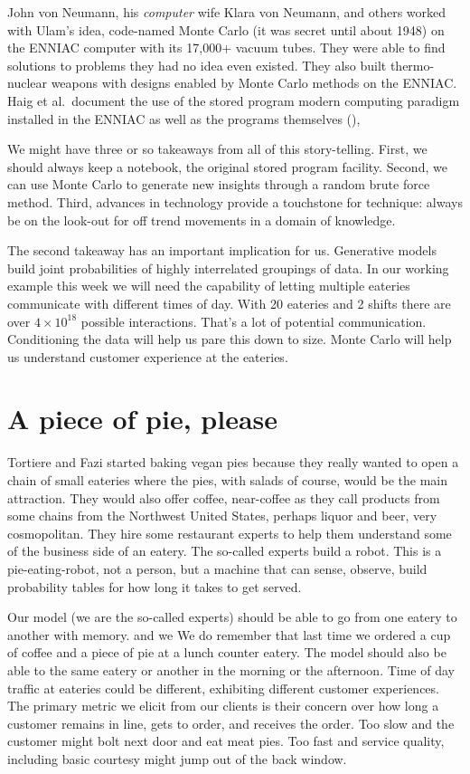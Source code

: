 \documentclass[
]{book}
\begin{document}
John von Neumann, his \emph{computer} wife Klara von Neumann, and others worked with Ulam's idea, code-named Monte Carlo (it was secret until about 1948) on the ENNIAC computer with its 17,000+ vacuum tubes. They were able to find solutions to problems they had no idea even existed. They also built thermo-nuclear weapons with designs enabled by Monte Carlo methods on the ENNIAC. Haig et al.~document the use of the stored program modern computing paradigm installed in the ENNIAC as well as the programs themselves (\citet{Haigh2014}),

We might have three or so takeaways from all of this story-telling. First, we should always keep a notebook, the original stored program facility. Second, we can use Monte Carlo to generate new insights through a random brute force method. Third, advances in technology provide a touchstone for technique: always be on the look-out for off trend movements in a domain of knowledge.

The second takeaway has an important implication for us. Generative models build joint probabilities of highly interrelated groupings of data. In our working example this week we will need the capability of letting multiple eateries communicate with different times of day. With 20 eateries and 2 shifts there are over \(4 \times 10^{18}\) possible interactions. That's a lot of potential communication. Conditioning the data will help us pare this down to size. Monte Carlo will help us understand customer experience at the eateries.

\hypertarget{a-piece-of-pie-please}{%
\section{A piece of pie, please}\label{a-piece-of-pie-please}}

Tortiere and Fazi started baking vegan pies because they really wanted to open a chain of small eateries where the pies, with salads of course, would be the main attraction. They would also offer coffee, near-coffee as they call products from some chains from the Northwest United States, perhaps liquor and beer, very cosmopolitan. They hire some restaurant experts to help them understand some of the business side of an eatery. The so-called experts build a robot. This is a pie-eating-robot, not a person, but a machine that can sense, observe, build probability tables for how long it takes to get served.

Our model (we are the so-called experts) should be able to go from one eatery to another with memory. and we We do remember that last time we ordered a cup of coffee and a piece of pie at a lunch counter eatery. The model should also be able to the same eatery or another in the morning or the afternoon. Time of day traffic at eateries could be different, exhibiting different customer experiences. The primary metric we elicit from our clients is their concern over how long a customer remains in line, gets to order, and receives the order. Too slow and the customer might bolt next door and eat meat pies. Too fast and service quality, including basic courtesy might jump out of the back window.
\end{document}
